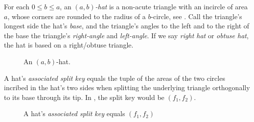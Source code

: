 \documentclass[%
    a4paper,              %
    style=screen,          %
    bibliography=totoc,   %
    nexus,                %
    lnum,                 %
    extramargin,          %
]{tubsbook}
\newcommand\defaulta{30}
\newcommand\defaultb{40}
\newcommand\defaultr{0.2}
\begin{document}
\begin{definition}
    For each $0 \le b \le a$, an \emph{$(a,b)$-hat} is a non-acute triangle with an incircle of area $a$, whose corners are rounded to the radius of a $b$-circle, see . Call the triangle's longest side the hat's \emph{base}, and the triangle's angles to the left and to the right of the base the triangle's \emph{right-angle} and \emph{left-angle}.
    If we say \emph{right hat} or \emph{obtuse hat}, the hat is based on a right/obtuse triangle.
\end{definition}

\begin{figure}[htbp!]
    \centering


    \caption{An $(a,b)$-hat.}
    \label{fig:hat}
\end{figure}

\begin{definition}\label{def:hat-split-key}
    A hat's \emph{associated split key} equals the tuple of the areas of the two circles incribed in the hat's two sides when splitting the underlying triangle orthogonally to its base through its tip. In , the split key would be $(f_1, f_2)$.
\end{definition}

\begin{figure}[htbp!]
    \centering


    \caption{A hat's \emph{associated split key} equals $(f_1, f_2)$}
    \label{fig:hatf}
\end{figure}
\end{document}
